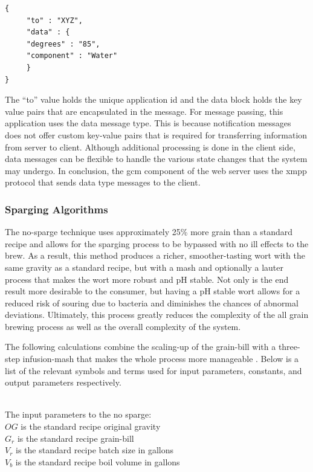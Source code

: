 \documentclass{article}
\begin{document}
\begin{lstlisting}
{
     "to" : "XYZ",
     "data" : {
     "degrees" : "85",
     "component" : "Water"
     }
}
\end{lstlisting}

The ``to'' value holds the unique application id and the data block holds the key value pairs that are encapsulated in the message.
For message passing, this application uses the data message type. This is because notification messages does not offer custom key-value pairs that is required for transferring information from server to client. Although additional processing is done in the client side, data messages can be flexible to handle the various state changes that the system may undergo. In conclusion, the \gls{gcm} component of the web server uses the \gls{xmpp} protocol that sends data type messages to the client. 

\subsubsection{Sparging Algorithms}\label{sec:no-sparge}
The no-\gls{sparge} technique uses approximately 25\% more grain than a standard recipe and allows for the sparging process to be bypassed with no ill effects to the brew.  As a result, this method produces a richer, smoother-tasting \gls{wort} with the same \gls{gravity} as a standard recipe, but with a \gls{mash} and optionally a \gls{lauter} process that makes the \gls{wort} more robust and pH stable.  Not only is the end result more desirable to the consumer, but having a pH stable \gls{wort} allows for a reduced risk of souring due to bacteria and diminishes the chances of abnormal deviations.  Ultimately, this process greatly reduces the complexity of the all grain brewing process as well as the overall complexity of the system.

The following calculations combine the scaling-up of the \gls{grain-bill} with a three-step infusion-\gls{mash} that makes the whole process more manageable \cite{sparging}.  Below is a list of the relevant symbols and terms used for input parameters, constants, and output parameters respectively.

\noindent \\The input parameters to the no \gls{sparge}: \\
$OG$ is the standard recipe original \gls{gravity} \\
$G_{r}$ is the standard recipe \gls{grain-bill} \\
$V_{r}$ is the standard recipe batch size in gallons \\
$V_{b}$ is the standard recipe boil volume in gallons \\
\end{document}
